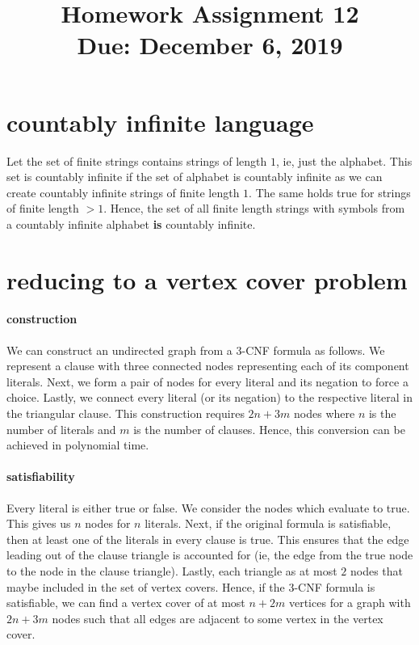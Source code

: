\documentclass[11pt,letterpaper]{article}
\title{Homework Assignment 12 \\
    \small Due: December 6, 2019}
\begin{document}
\maketitle

\section{countably infinite language}
Let the set of finite strings contains strings of length $1$, ie, just the alphabet. This set is countably infinite if the set of alphabet is countably infinite as we can create countably infinite strings of finite length $1$. The same holds true for strings of finite length $>1$. Hence, the set of all finite length strings with symbols from a countably infinite alphabet \textbf{is} countably infinite.

\section{reducing to a vertex cover problem}
\paragraph{construction} We can construct an undirected graph from a 3-CNF formula as follows. 
We represent a clause with three connected nodes representing each of its component literals. Next, we form a pair of nodes for every literal and its negation to force a choice. Lastly, we connect every literal (or its negation) to the respective literal in the triangular clause. This construction requires $2n+3m$ nodes where $n$ is the number of literals and $m$ is the number of clauses. Hence, this conversion can be achieved in polynomial time.
\paragraph{satisfiability} Every literal is either true or false. We consider the nodes which evaluate to true. This gives us $n$ nodes for $n$ literals. Next, if the original formula is satisfiable, then at least one of the literals in every clause is true. This ensures that the edge leading out of the clause triangle is accounted for (ie, the edge from the true node to the node in the clause triangle). Lastly, each triangle as at most $2$ nodes that maybe included in the set of vertex covers. Hence, if the 3-CNF formula is satisfiable, we can find a vertex cover of at most $n+2m$ vertices for a graph with $2n+3m$ nodes such that all edges are adjacent to some vertex in the vertex cover.
\end{document}
